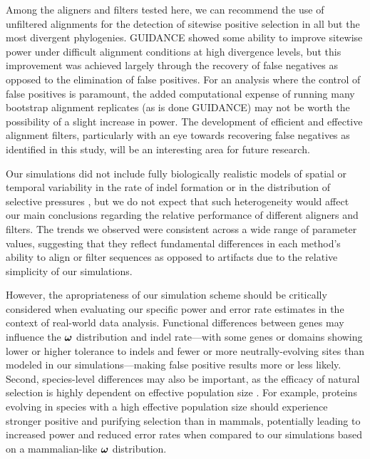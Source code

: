 \documentclass{article}
\begin{document}
Among the aligners and filters tested here, we can recommend the use
of unfiltered \prankc alignments for the detection of sitewise
positive selection in all but the most divergent phylogenies. GUIDANCE
showed some ability to improve sitewise power under difficult
alignment conditions at high divergence levels, but this improvement
was achieved largely through the recovery of false negatives as
opposed to the elimination of false positives. For an analysis where
the control of false positives is paramount, the added computational
expense of running many bootstrap alignment replicates (as is done
GUIDANCE) may not be worth the possibility of a slight increase in
power. The development of efficient and effective alignment filters,
particularly with an eye towards recovering false negatives as
identified in this study, will be an interesting area for future
research.

Our simulations did not include fully biologically realistic models of
spatial or temporal variability in the rate of indel formation or in
the distribution of selective pressures \citep{Whelan2008Spatial}, but
we do not expect that such heterogeneity would affect our main
conclusions regarding the relative performance of different aligners
and filters. The trends we observed were consistent across a wide
range of parameter values, suggesting that they reflect fundamental
differences in each method's ability to align or filter sequences as
opposed to artifacts due to the relative simplicity of our
simulations.

However, the apropriateness of our simulation scheme should be
critically considered when evaluating our specific power and error
rate estimates in the context of real-world data analysis. Functional
differences between genes may influence the $\bm{\omega}$ distribution and
indel rate---with some genes or domains showing lower or higher
tolerance to indels and fewer or more neutrally-evolving sites than
modeled in our simulations---making false positive results more or
less likely. Second, species-level differences may also be important,
as the efficacy of natural selection is highly dependent on effective
population size \citep{Ellegren2009Selection}. For example, proteins
evolving in \Dr species with a high effective population size should
experience stronger positive and purifying selection than in mammals,
potentially leading to increased power and reduced error rates when
compared to our simulations based on a mammalian-like $\bm{\omega}$
distribution.
\end{document}
